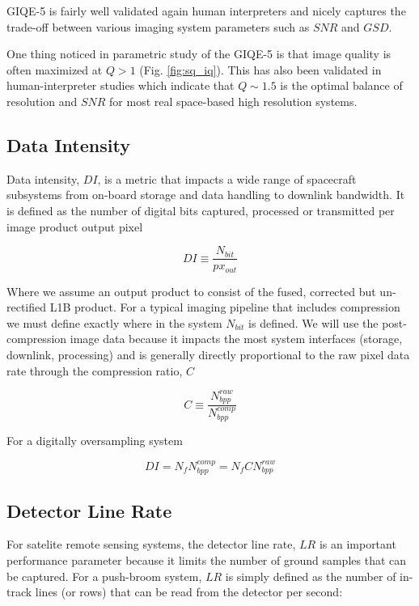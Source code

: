 \documentclass[10pt,journal]{IEEEtran}  %
\begin{document}
GIQE-5 is fairly well validated again human interpreters \cite{giqe5} and nicely captures the trade-off between various imaging system parameters such as $SNR$ and $GSD$.  

One thing noticed in parametric study of the GIQE-5 is that image quality is often maximized at $Q>1$ (Fig. \ref{fig:sq_iq}).  This has also been validated in human-interpreter studies \cite{fiete_Q_IQ} which indicate that $Q \sim 1.5$ is the optimal balance of resolution and $SNR$ for most real space-based high resolution systems.  
\subsection{Data Intensity}

Data intensity, $DI$, is a metric that impacts a wide range of spacecraft subsystems from on-board storage and data handling to downlink bandwidth.  It is defined as the number of digital bits captured, processed or transmitted per image product output pixel

$$DI \equiv \frac{N_{bit}}{px_{out}}$$

Where we assume an output product to consist of the fused, corrected but un-rectified L1B product. For a typical imaging pipeline that includes compression we must define exactly where in the system $N_{bit}$ is defined.  We will use the post-compression image data because it impacts the most system interfaces (storage, downlink, processing) and is generally directly proportional to the raw pixel data rate through the compression ratio, $C$

\begin{equation}
    \label{eq:compression}
    C \equiv \frac{N_{bpp}^{raw}}{N_{bpp}^{comp}}
\end{equation}

For a digitally oversampling system

\begin{equation}
    DI = N_f N_{bpp}^{comp} = N_f C N_{bpp}^{raw}
\end{equation}

\subsection{Detector Line Rate}
For satelite remote sensing systems, the detector line rate, $LR$ is an important performance parameter because it limits the number of ground samples that can be captured.  For a push-broom system, $LR$ is simply defined as the number of in-track lines (or rows) that can be read from the detector per second:
\end{document}
